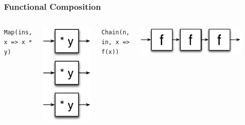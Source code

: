 \documentclass[xcolor=pdflatex,dvipsnames,table]{beamer}
\begin{document}
\begin{frame}
\frametitle{Functional Composition}


\begin{Large}
\begin{columns}

\verb+Map(ins, x => x * y)+ \\
\begin{center}
\includegraphics[height=0.6\textheight]{figs/map.pdf} \\[2cm]
\end{center}

\verb+Chain(n, in, x => f(x))+ \\
\begin{center}
\includegraphics[width=0.9\textwidth]{figs/chain.pdf} \\
\end{center}


\end{columns}
\end{Large}
\end{frame}
\end{document}
